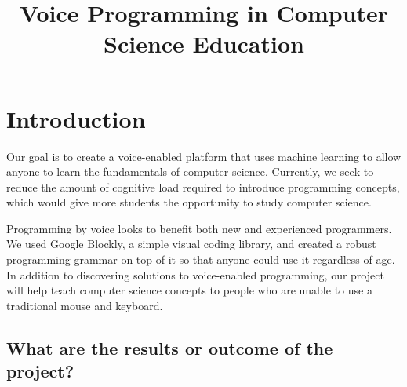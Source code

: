 \documentclass[]{article}
\title{Voice Programming in Computer Science Education}
\begin{document}
\maketitle

\section{Introduction}


Our goal is to create a voice-enabled platform that uses machine learning to allow anyone to learn the fundamentals of computer science. Currently, we seek to reduce the amount of cognitive load required to introduce programming concepts, which would give more 
students the opportunity to study computer science. 

Programming by voice looks to benefit both new and experienced programmers. We used Google Blockly, a simple visual coding library, and created a robust programming grammar on top of it so that anyone could use it regardless of age. In addition to discovering solutions to voice-enabled programming, our project will help teach computer science concepts to people who are unable to use a traditional mouse and keyboard.

\subsection{What are the results or outcome of the project?}
\end{document}
